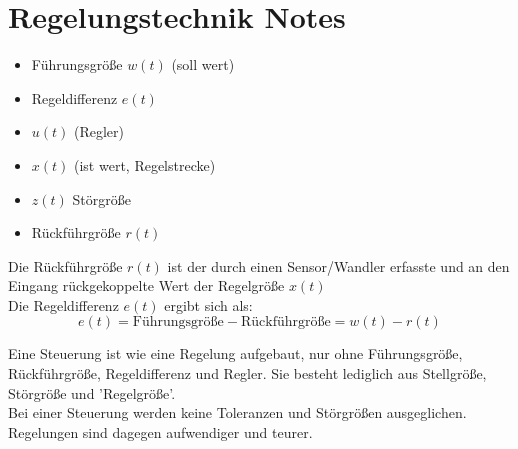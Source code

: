\documentclass[a4paper, 12pt]{article}
\begin{document}
\section{Regelungstechnik Notes}

\begin{itemize}
  \item Führungsgröße $w(t)$ (soll wert)
  \item Regeldifferenz $e(t)$
  \item $u(t)$ (Regler)
  \item $x(t)$ (ist wert, Regelstrecke)
  \item $z(t)$ Störgröße
  \item Rückführgröße $r(t)$ 
\end{itemize}

Die Rückführgröße $r(t)$ ist der durch einen Sensor/Wandler erfasste und an den Eingang
rückgekoppelte Wert der Regelgröße $x(t)$ \\

\noindent Die Regeldifferenz $e(t)$ ergibt sich als:
$$e(t) = \textrm{Führungsgröße} - \textrm{Rückführgröße} = w(t)-r(t)$$


\noindent Eine Steuerung ist wie eine Regelung aufgebaut, nur ohne
Führungsgröße, Rückführgröße, Regeldifferenz und Regler. Sie besteht lediglich aus
Stellgröße, Störgröße und 'Regelgröße'.\\
Bei einer Steuerung werden keine Toleranzen und Störgrößen ausgeglichen.
Regelungen sind dagegen aufwendiger und teurer.

\holine{\textwidth}
\end{document}
